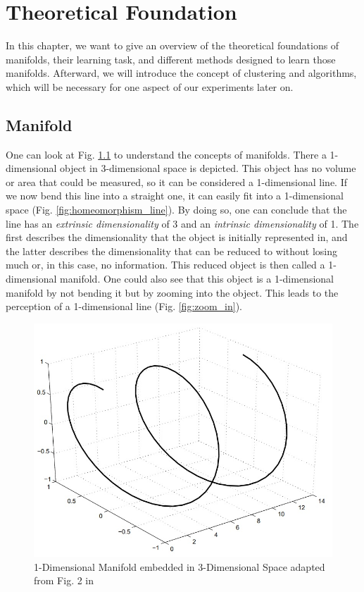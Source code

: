 \chapter{Theoretical Foundation}

In this chapter, we want to give an overview of the theoretical foundations of manifolds, their learning task, and different methods designed to learn those manifolds. Afterward, we will introduce the concept of clustering and algorithms, which will be necessary for one aspect of our experiments later on.

\section{Manifold}

One can look at Fig. \ref{fig:1-dimensional_manifold} to understand the concepts of manifolds. There a 1-dimensional object in 3-dimensional space is depicted. This object has no volume or area that could be measured, so it can be considered a 1-dimensional line. If we now bend this line into a straight one, it can easily fit into a 1-dimensional space (Fig. \ref{fig:homeomorphism_line}). By doing so, one can conclude that the line has an \textit{extrinsic dimensionality} of 3 and an \textit{intrinsic dimensionality} of 1. The first describes the dimensionality that the object is initially represented in, and the latter describes the dimensionality that can be reduced to without losing much or, in this case, no information. This reduced object is then called a  1-dimensional manifold. One could also see that this object is a 1-dimensional manifold by not bending it but by zooming into the object. This leads to the perception of a 1-dimensional line (Fig. \ref{fig:zoom_in}). \cite{Cayton05}
\begin{figure}[!]
	\centering
	\includegraphics[width=\columnwidth-5cm]{images/1-dimensional_manifold.jpg}
	\caption[1-Dimensional Manifold]{1-Dimensional Manifold embedded in 3-Dimensional Space adapted from Fig. 2 in \cite{Cayton05}}
    \label{fig:1-dimensional_manifold}
\end{figure}
